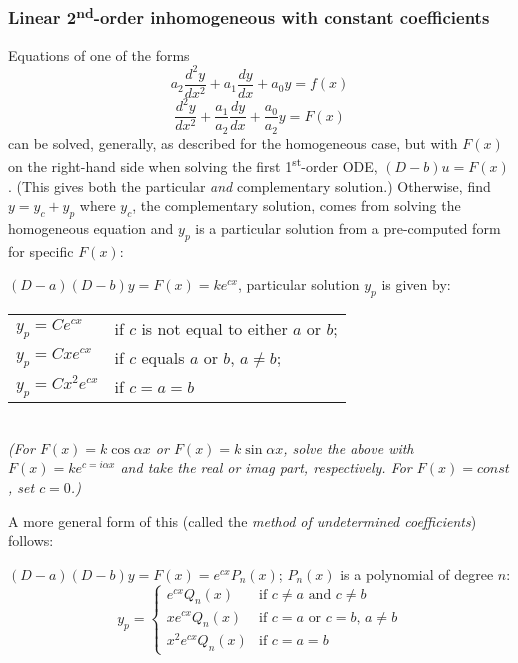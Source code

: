 \documentclass[letterpaper,landscape,10pt]{article}
\begin{document}
{\begin{multicols}{3}
		\subsubsection*{Linear 2\textsuperscript{nd}-order inhomogeneous
				with constant coefficients}
			Equations of one of the forms\\
			$$
				a_2 \frac{d^2y}{dx^2} + a_1 \frac{dy}{dx} + a_0y = f(x)
			$$
			$$
				\frac{d^2y}{dx^2} + \frac{a_1}{a_2} \frac{dy}{dx} +
					\frac{a_0}{a_2}y = F(x)
			$$
			can be solved, generally, as described for the homogeneous case,
			but with $F(x)$ on the right-hand side when solving the first
			1\textsuperscript{st}-order ODE, $(D-b)u=F(x)$.  (This gives both
			the particular \emph{and} complementary solution.)  Otherwise, find
			$y = y_c + y_p$ where $y_c$, the complementary solution, comes from
			solving the homogeneous equation and $y_p$ is a particular solution
			from a pre-computed form for specific $F(x)$:\\
			\begin{center}
			$(D-a)(D-b)y=F(x)=ke^{cx}$, particular solution $y_p$ is given by:\\
			\begin{tabular}{ l l }
				$y_p=Ce^{cx}$ & if $c$ is not equal to either $a$ or $b$; \\
				$y_p=Cxe^{cx}$ & if $c$ equals $a$ or $b$, $a\neq b$;\\
				$y_p=Cx^2e^{cx}$ & if $c=a=b$ \\
			\end{tabular}\\
			\emph{(For $F(x)=k\cos\alpha x$ or $F(x)=k\sin\alpha x$, solve the
			above with $F(x)=ke^{c=i\alpha x}$ and take the real or imag part,
			respectively. For $F(x)=const$, set $c=0$.)}
			\end{center}
			A more general form of this (called the \emph{method of
			undetermined coefficients}) follows:\\
			\begin{center}
				$(D-a)(D-b)y=F(x)=e^{cx}P_n(x)$; $P_n(x)$ is a polynomial of
				degree $n$:
				\[
				y_p = 
				\begin{cases}
					   e^{cx}Q_n(x) & \text{if $c \neq a$ and $c \neq b$}\\
					  xe^{cx}Q_n(x) & \text{if $c=a$ or $c=b$, $a\neq b$}\\
					x^2e^{cx}Q_n(x) & \text{if $c=a=b$}
				\end{cases}
				\]
			\end{center}


\end{multicols}}
\end{document}
